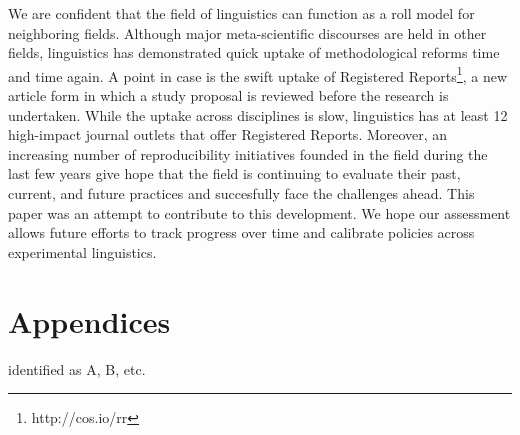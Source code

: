 \documentclass[]{elsarticle} %
\begin{document}
We are confident that the field of linguistics can function as a roll model for neighboring fields. Although major meta-scientific discourses are held in other fields, linguistics has demonstrated quick uptake of methodological reforms time and time again. A point in case is the swift uptake of Registered Reports\footnote{http://cos.io/rr}, a new article form in which a study proposal is reviewed before the research is undertaken. While the uptake across disciplines is slow, linguistics has at least 12 high-impact journal outlets that offer Registered Reports. Moreover, an increasing number of reproducibility initiatives founded in the field during the last few years give hope that the field is continuing to evaluate their past, current, and future practices and succesfully face the challenges ahead. This paper was an attempt to contribute to this development. We hope our assessment allows future efforts to track progress over time and calibrate policies across experimental linguistics.

\hypertarget{appendices}{%
\section{Appendices}\label{appendices}}

identified as A, B, etc.
\end{document}
